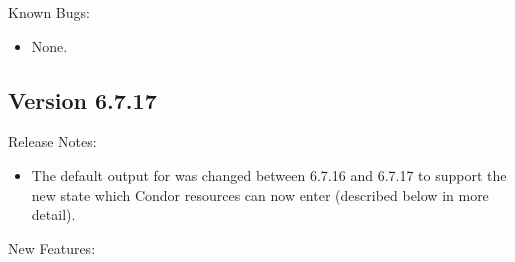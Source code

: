 \noindent Known Bugs:

\begin{itemize}

\item None.

\end{itemize}

\subsection*{\label{sec:New-6-7.17}Version 6.7.17}

\noindent Release Notes:

\begin{itemize}


\item The default output for  was changed between
  6.7.16 and 6.7.17 to support the new  state which
  Condor resources can now enter (described below in more detail).

\end{itemize}

\noindent New Features:

